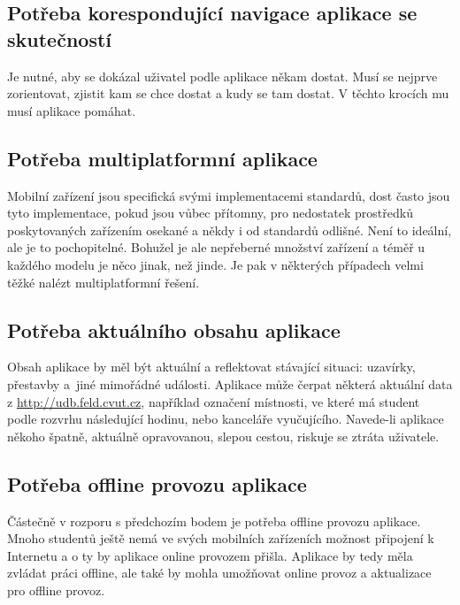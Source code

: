 \subsection{Potřeba korespondující navigace aplikace se skutečností}
Je nutné, aby se dokázal uživatel podle aplikace někam dostat. Musí se nejprve zorientovat, zjistit kam se chce dostat a kudy se tam dostat. V těchto krocích mu musí aplikace pomáhat.

\subsection{Potřeba multiplatformní aplikace}
Mobilní zařízení jsou specifická svými implementacemi standardů, dost často jsou tyto implementace, pokud jsou vůbec přítomny, pro nedostatek prostředků poskytovaných zařízením osekané a někdy i od standardů odlišné. Není to ideální, ale je to pochopitelné. Bohužel je ale nepřeberné množství zařízení a téměř u každého modelu je něco jinak, než jinde. Je pak v některých případech velmi těžké nalézt multiplatformní řešení.

\subsection{Potřeba aktuálního obsahu aplikace}
Obsah aplikace by měl být aktuální a reflektovat stávající situaci: uzavírky, přestavby a~jiné mimořádné události. Aplikace může čerpat některá aktuální data z \url{http://udb.feld.cvut.cz}, například označení místnosti, ve které má student podle rozvrhu následující hodinu, nebo kanceláře vyučujícího. Navede-li aplikace někoho špatně, aktuálně opravovanou, slepou cestou, riskuje se ztráta uživatele.

\subsection{Potřeba offline provozu aplikace}
Částečně v rozporu s předchozím bodem je potřeba offline provozu aplikace. Mnoho studentů ještě nemá ve svých mobilních zařízeních možnost připojení k Internetu a o ty by aplikace online provozem přišla. Aplikace by tedy měla zvládat práci offline, ale také by mohla umožňovat online provoz a aktualizace pro offline provoz.

